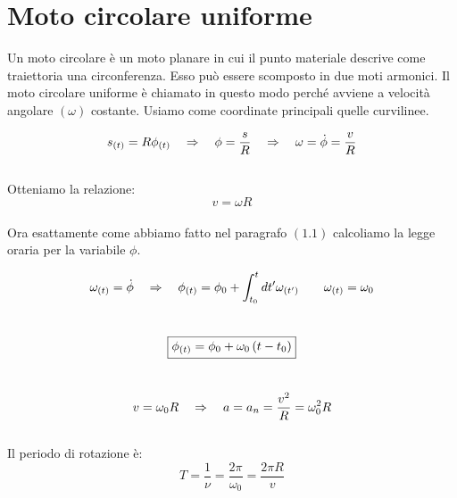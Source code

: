\section{Moto circolare uniforme}
Un moto circolare è un moto planare in cui il punto materiale descrive come
traiettoria una circonferenza. Esso può essere scomposto in due moti armonici. Il moto circolare uniforme è chiamato in questo modo perché avviene a velocità angolare $(\omega)$ costante.
Usiamo come coordinate principali quelle curvilinee.

\begin{equation}
    s_{(t)} = R\phi_{(t)}\quad\Rightarrow\quad \phi = \frac sR\quad\Rightarrow\quad \omega = \dot \phi = \frac vR
\end{equation}
\\
Otteniamo la relazione:
\begin{equation}
    \boxed{v = \omega R}
\label{eq:v=wr}
\end{equation}
\\
Ora esattamente come abbiamo fatto nel paragrafo $(1.1)$ calcoliamo la 
legge oraria per la variabile $\phi$.

\begin{equation}
    \omega_{(t)} = \dot\phi \quad\Rightarrow\quad \phi_{(t)} = \phi_0 + \int_{t_0}^{t}dt'
    \omega_{(t')}\quad\quad \omega_{(t)} = \omega_0
\end{equation}
\\
\begin{equation}
    \boxed{\phi_{(t)} = \phi_0 +\omega_0\left( t - t_0\right)}
\label{eq:MCU}
\end{equation}
\\
\begin{equation}
    v = \omega_0R\quad\Rightarrow\quad a = a_n = \frac{v^2}R = \omega_0^2R
\label{eq:an}
\end{equation}
\\
Il periodo di rotazione è:
\begin{equation}
    T = \frac1\nu = \frac{2\pi}{\omega_0} = \frac{2\pi R}v
\label{eq:period}
\end{equation}
